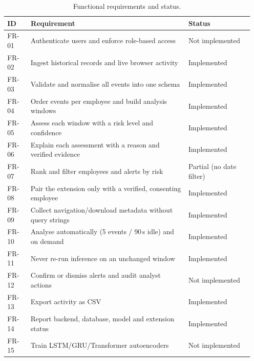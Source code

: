 \documentclass[openany]{tietreport}
\begin{document}
\begin{table}[H]
\centering
\small
\caption{Functional requirements and status.}
\label{tab:fr}
\begin{tabularx}{\linewidth}{@{}lYl@{}}
\toprule
\textbf{ID} & \textbf{Requirement} & \textbf{Status} \\
\midrule
FR-01 & Authenticate users and enforce role-based access & Not implemented \\
FR-02 & Ingest historical records and live browser activity & Implemented \\
FR-03 & Validate and normalise all events into one schema & Implemented \\
FR-04 & Order events per employee and build analysis windows & Implemented \\
FR-05 & Assess each window with a risk level and confidence & Implemented \\
FR-06 & Explain each assessment with a reason and verified evidence & Implemented \\
FR-07 & Rank and filter employees and alerts by risk & Partial (no date filter) \\
FR-08 & Pair the extension only with a verified, consenting employee & Implemented \\
FR-09 & Collect navigation/download metadata without query strings & Implemented \\
FR-10 & Analyse automatically (5 events / 90\,s idle) and on demand & Implemented \\
FR-11 & Never re-run inference on an unchanged window & Implemented \\
FR-12 & Confirm or dismiss alerts and audit analyst actions & Not implemented \\
FR-13 & Export activity as CSV & Implemented \\
FR-14 & Report backend, database, model and extension status & Implemented \\
FR-15 & Train LSTM/GRU/Transformer autoencoders & Not implemented \\
\bottomrule
\end{tabularx}
\end{table}
\end{document}
